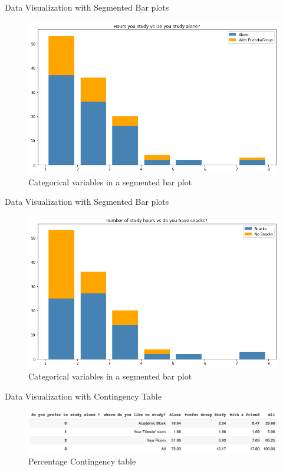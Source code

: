 \documentclass{beamer}
\begin{document}
\begin{frame}
\begin{block}{Data Visualization with Segmented Bar plots}
\begin{figure}[hbtp]
\caption{Categorical variables in a segmented bar plot}
\centering
\includegraphics[scale=0.45]{hoursalone.png}
\end{figure}
\end{block}
\end{frame}

\begin{frame}
\begin{block}{Data Visualization with Segmented Bar plots}
\begin{figure}[hbtp]
\caption{Categorical variables in a segmented bar plot}
\centering
\includegraphics[scale=0.45]{snackstudytime.png}
\end{figure}
\end{block}
\end{frame}

\begin{frame}
\begin{block}{Data Visualization with Contingency Table}
\begin{figure}[hbtp]
\caption{Percentage Contingency table}
\centering
\includegraphics[scale=0.35]{output6.png}
\end{figure}
\end{block}
\end{frame}
\end{document}
